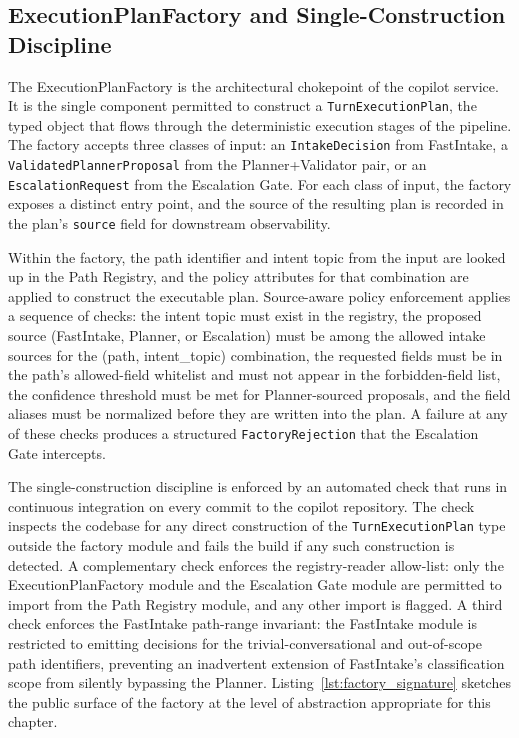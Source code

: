 \subsection{ExecutionPlanFactory and Single-Construction Discipline}
The ExecutionPlanFactory is the architectural chokepoint of the copilot service. It is the single component permitted to construct a \texttt{TurnExecutionPlan}, the typed object that flows through the deterministic execution stages of the pipeline. The factory accepts three classes of input: an \texttt{IntakeDecision} from FastIntake, a \texttt{ValidatedPlannerProposal} from the Planner+Validator pair, or an \texttt{EscalationRequest} from the Escalation Gate. For each class of input, the factory exposes a distinct entry point, and the source of the resulting plan is recorded in the plan's \texttt{source} field for downstream observability.

Within the factory, the path identifier and intent topic from the input are looked up in the Path Registry, and the policy attributes for that combination are applied to construct the executable plan. Source-aware policy enforcement applies a sequence of checks: the intent topic must exist in the registry, the proposed source (FastIntake, Planner, or Escalation) must be among the allowed intake sources for the (path, intent\_topic) combination, the requested fields must be in the path's allowed-field whitelist and must not appear in the forbidden-field list, the confidence threshold must be met for Planner-sourced proposals, and the field aliases must be normalized before they are written into the plan. A failure at any of these checks produces a structured \texttt{FactoryRejection} that the Escalation Gate intercepts.

The single-construction discipline is enforced by an automated check that runs in continuous integration on every commit to the copilot repository. The check inspects the codebase for any direct construction of the \texttt{TurnExecutionPlan} type outside the factory module and fails the build if any such construction is detected. A complementary check enforces the registry-reader allow-list: only the ExecutionPlanFactory module and the Escalation Gate module are permitted to import from the Path Registry module, and any other import is flagged. A third check enforces the FastIntake path-range invariant: the FastIntake module is restricted to emitting decisions for the trivial-conversational and out-of-scope path identifiers, preventing an inadvertent extension of FastIntake's classification scope from silently bypassing the Planner. Listing~\ref{lst:factory_signature} sketches the public surface of the factory at the level of abstraction appropriate for this chapter.

